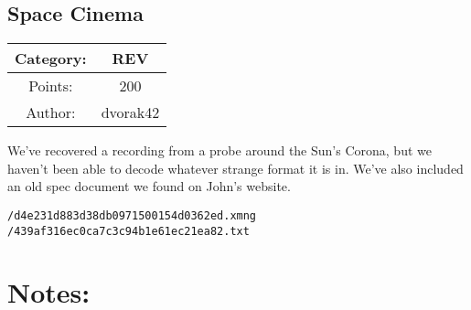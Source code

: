 \begin{center}
\section*{Space Cinema}
{\large
\begin{tabular}{| c c |}
\hline
Category: & REV\\\hline
Points: & 200\\\hline
Author: & dvorak42\\\hline
\end{tabular}
}
\end{center}
\vspace{0.5in}

{\large
We've recovered a recording from a probe around the Sun's Corona, but we haven't been able to decode whatever strange format it is in. We've also included an old spec document we found on John's website.
}
\vspace{0.25in}
\begin{center}
  {\Large\tt /d4e231d883d38db0971500154d0362ed.xmng}\\
  {\Large\tt /439af316ec0ca7c3c94b1e61ec21ea82.txt}
\end{center}

\vspace{0.25in}
\section*{Notes:}
